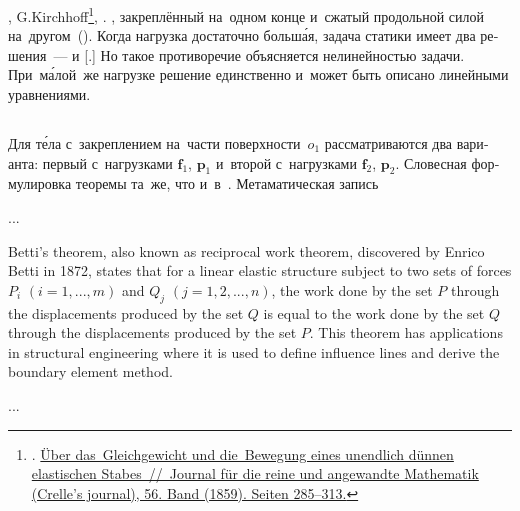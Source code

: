 

\begin{otherlanguage}{russian}

,  G.\:Kirchhoff\footnote{. \href{https://opacplus.bsb-muenchen.de/Vta2/bsb10525510/bsb:2960444?page=291}{Über das~Gleich\-gewicht und die~Bewe\-gung eines unendlich dünnen elastischen Stabes~//~Journal für die reine und angewandte Mathematik (Crelle’s journal), 56. Band (1859). Seiten 285\hbox{--}313.}}\hbox{\hspace{-0.5ex},} .
  , закреплённый на~одном конце и~сжатый продольной силой на~другом~(). Когда нагрузка достаточно больш\'{а}я, задача статики имеет два решения~---  и [.]
Но такое противоречие объясняется нелинейностью задачи. При~м\'{а}лой~же нагрузке решение единственно и~может быть описано линейными уравнениями.

\subsection*{}

Для т\'{е}ла с~закреплением на~части поверхности~${o_1}$ рассматриваются два варианта: первый с~нагрузками $\bm{f}_1$, $\bm{p}_1$ и~второй с~нагрузками $\bm{f}_2$, $\bm{p}_2$. Словесная формулировка теоремы та~же, что и~в~. Метаматическая запись

...

{\small
Betti’s theorem, also known as reciprocal work theorem, discovered by Enrico Betti in 1872, states that for a linear elastic structure subject to two sets of forces ${P_i}$ ${(i = 1, ..., m)}$ and ${Q_j}$ ${(j = 1, 2, ..., n)}$, the work done by the set $P$ through the displacements produced by the set $Q$ is equal to the work done by the set $Q$ through the displacements produced by the set $P$. This theorem has applications in structural engineering where it is used to define influence lines and derive the boundary element method.
\par}

...


\end{otherlanguage}

